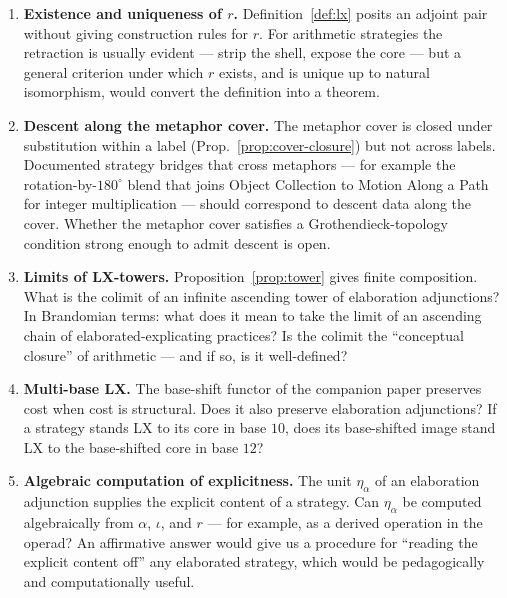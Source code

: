 \documentclass[11pt]{article}
\begin{document}
\begin{enumerate}[noitemsep,topsep=2pt,label=(\arabic*)]
  \item \textbf{Existence and uniqueness of $r$.} Definition~\ref{def:lx}
        posits an adjoint pair without giving construction rules for
        $r$. For arithmetic strategies the retraction is usually
        evident — strip the shell, expose the core — but a general
        criterion under which $r$ exists, and is unique up to
        natural isomorphism, would convert the definition into a
        theorem.
  \item \textbf{Descent along the metaphor cover.} The metaphor
        cover is closed under substitution within a label
        (Prop.~\ref{prop:cover-closure}) but not across labels.
        Documented strategy bridges that cross metaphors — for
        example the rotation-by-$180^\circ$ blend that joins
        Object Collection to Motion Along a Path for integer
        multiplication — should correspond to descent data along
        the cover. Whether the metaphor cover satisfies a
        Grothendieck-topology condition strong enough to admit
        descent is open.
  \item \textbf{Limits of LX-towers.} Proposition~\ref{prop:tower}
        gives finite composition. What is the colimit of an infinite
        ascending tower of elaboration adjunctions? In Brandomian terms: what
        does it mean to take the limit of an ascending chain of
        elaborated-explicating practices? Is the colimit the
        ``conceptual closure'' of arithmetic — and if so, is it
        well-defined?
  \item \textbf{Multi-base LX.} The base-shift functor of the
        companion paper preserves cost when cost is structural. Does
        it also preserve elaboration adjunctions? If a strategy stands LX to
        its core in base $10$, does its base-shifted image stand LX
        to the base-shifted core in base $12$?
  \item \textbf{Algebraic computation of explicitness.} The unit
        $\eta_\alpha$ of an elaboration adjunction supplies the explicit
        content of a strategy. Can $\eta_\alpha$ be computed
        algebraically from $\alpha$, $\iota$, and $r$ — for example,
        as a derived operation in the operad? An affirmative answer
        would give us a procedure for ``reading the explicit content
        off'' any elaborated strategy, which would be
        pedagogically and computationally useful.
\end{enumerate}
\end{document}
